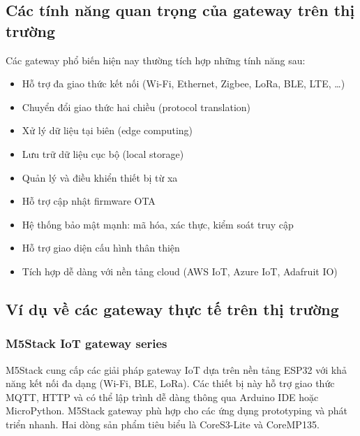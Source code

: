         \subsection{Các tính năng quan trọng của gateway trên thị trường}
            Các gateway phổ biến hiện nay thường tích hợp những tính năng sau:
            \begin{itemize}
                \item Hỗ trợ đa giao thức kết nối (Wi-Fi, Ethernet, Zigbee, LoRa, BLE, LTE, \ldots)
                \item Chuyển đổi giao thức hai chiều (protocol translation)
                \item Xử lý dữ liệu tại biên (edge computing)
                \item Lưu trữ dữ liệu cục bộ (local storage)
                \item Quản lý và điều khiển thiết bị từ xa
                \item Hỗ trợ cập nhật firmware OTA
                \item Hệ thống bảo mật mạnh: mã hóa, xác thực, kiểm soát truy cập
                \item Hỗ trợ giao diện cấu hình thân thiện
                \item Tích hợp dễ dàng với nền tảng cloud (AWS IoT, Azure IoT, Adafruit IO)
            \end{itemize}
        \subsection{Ví dụ về các gateway thực tế trên thị trường}
            \subsubsection*{M5Stack IoT gateway series}
                M5Stack cung cấp các giải pháp gateway IoT dựa trên nền tảng ESP32 với khả năng kết nối đa dạng (Wi-Fi, BLE, LoRa). Các thiết bị này hỗ trợ giao thức MQTT, HTTP và có thể lập trình dễ dàng thông qua Arduino IDE hoặc MicroPython. M5Stack gateway phù hợp cho các ứng dụng prototyping và phát triển nhanh. Hai dòng sản phẩm tiêu biểu là CoreS3-Lite và CoreMP135.

